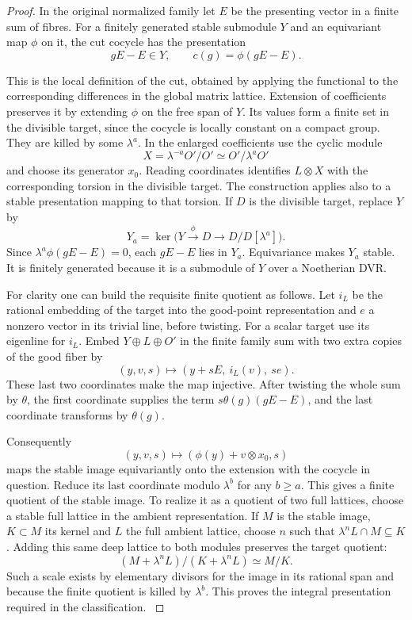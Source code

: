 \begin{proof}
In the original normalized family let \(E\) be the presenting vector in a finite sum of fibres. For a finitely generated stable submodule \(Y\) and an equivariant map \(\phi\) on it, the cut cocycle has the presentation
\[
 gE-E\in Y,\qquad c(g)=\phi(gE-E).
\]

This is the local definition of the cut, obtained by applying
the functional to the corresponding differences in the global
matrix lattice. Extension of coefficients preserves it by extending
\(\phi\) on the free span of \(Y\). Its values form a finite set
in the divisible target, since the cocycle is locally constant
on a compact group. They are killed by some \(\lambda^a\).
In the enlarged coefficients use the cyclic module
\[
 X=\lambda^{-a}O'/O'\simeq O'/\lambda^a O'
\]
and choose its generator \(x_0\). Reading coordinates
identifies \(L\otimes X\) with the corresponding torsion in the
divisible target. The construction applies also to a stable
presentation mapping to that torsion. If \(D\) is the divisible target, replace \(Y\) by
\[
 Y_a=\ker\bigl(Y\xrightarrow{\ \phi\ }D\longrightarrow D/D[\lambda^a]\bigr).
\]
Since \(\lambda^a\phi(gE-E)=0\), each \(gE-E\) lies in \(Y_a\).
Equivariance makes \(Y_a\) stable. It is finitely generated because
it is a submodule of \(Y\) over a Noetherian DVR.

For clarity one can build the requisite finite quotient as follows.
Let \(i_L\) be the rational embedding of the target into the
good-point representation and \(e\) a nonzero vector in its
trivial line, before twisting. For a scalar target use its
eigenline for \(i_L\). Embed \(Y\oplus L\oplus O'\) in the
finite family sum with two extra copies of the good fiber by
\[
        (y,v,s)\longmapsto (y+sE,\ i_L(v),\ se).
\]
These last two coordinates make the map injective. After twisting
the whole sum by \(\theta\), the first coordinate supplies the
term \(s\theta(g)(gE-E)\), and the last coordinate transforms by \(\theta(g)\).

Consequently
\[
 (y,v,s)\mapsto(\phi(y)+v\otimes x_0,s)
\]
maps the
stable image equivariantly onto the extension with the cocycle
in question. Reduce its last coordinate modulo \(\lambda^b\) for
any \(b\ge a\). This gives a finite quotient of the stable image.
To realize it as a quotient of two full lattices, choose a stable
full lattice in the ambient representation. If \(M\) is the stable image, \(K\subset M\) its kernel and \(L\) the full ambient lattice, choose \(n\) such that \(\lambda^n L\cap M\subseteq K\). Adding this same deep lattice to both modules preserves the target quotient:
\[
 (M+\lambda^n L)/(K+\lambda^n L)\simeq M/K.
\]
Such a scale exists
by elementary divisors for the image in its rational span and
because the finite quotient is killed by \(\lambda^b\).
This proves the integral presentation required in the classification.
\label{cor:large-prime-length-5}


\end{proof}
